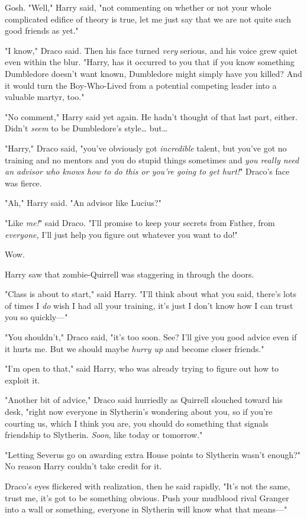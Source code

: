 Gosh. "Well," Harry said, "not commenting on whether or not your whole
complicated edifice of theory is true, let me just say that we are not quite
such good friends as yet."

"I know," Draco said. Then his face turned \emph{very} serious, and his voice
grew quiet even within the blur. "Harry, has it occurred to you that if you
know something Dumbledore doesn't want known, Dumbledore might simply have you
killed? And it would turn the Boy-Who-Lived from a potential competing leader
into a valuable martyr, too."

"No comment," Harry said yet again. He hadn't thought of that last part,
either. Didn't \emph{seem} to be Dumbledore's style{\ldots} but{\ldots}

"Harry," Draco said, "you've obviously got \emph{incredible} talent, but you've
got no training and no mentors and you do stupid things sometimes and \emph{you
really need an advisor who knows how to do this or you're going to get hurt!}"
Draco's face was fierce.

"Ah," Harry said. "An advisor like Lucius?"

"Like \emph{me!}" said Draco. "I'll promise to keep your secrets from Father,
from \emph{everyone,} I'll just help you figure out whatever you want to do!"

Wow.

Harry saw that zombie-Quirrell was staggering in through the doors.

"Class is about to start," said Harry. "I'll think about what you said, there's
lots of times I \emph{do} wish I had all your training, it's just I don't know
how I can trust you so quickly---"

"You shouldn't," Draco said, "it's too soon. See? I'll give you good advice
even if it hurts me. But we should maybe \emph{hurry up} and become closer
friends."

"I'm open to that," said Harry, who was already trying to figure out how to
exploit it.

"Another bit of advice," Draco said hurriedly as Quirrell slouched toward his
desk, "right now everyone in Slytherin's wondering about you, so if you're
courting us, which I think you are, you should do something that signals
friendship to Slytherin. \emph{Soon}, like today or tomorrow."

"Letting Severus go on awarding extra House points to Slytherin wasn't enough?"
No reason Harry couldn't take credit for it.

Draco's eyes flickered with realization, then he said rapidly, "It's not the
same, trust me, it's got to be something obvious. Push your mudblood rival
Granger into a wall or something, everyone in Slytherin will know what that
means---"

